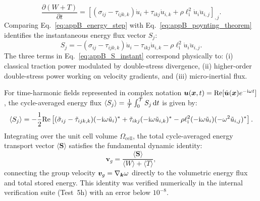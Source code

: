 \begin{equation}
\frac{\partial (W + T)}{\partial t} = \left[ (\sigma_{ij} - \tau_{ijk,k}) \dot{u}_i + \tau_{ikj} \dot{u}_{i,k} + \rho \ell_{\mathrm{i}}^2 \dot{u}_i \ddot{u}_{i,j} \right]_{,j}.
\label{eq:appB_energy_step}
\end{equation}
Comparing Eq.~\eqref{eq:appB_energy_step} with Eq.~\eqref{eq:appB_poynting_theorem} identifies the instantaneous energy flux vector $S_j$:
\begin{equation}
S_j = -(\sigma_{ij} - \tau_{ijk,k}) \dot{u}_i - \tau_{ikj} \dot{u}_{i,k} - \rho \ell_{\mathrm{i}}^2 \dot{u}_i \ddot{u}_{i,j}.
\label{eq:appB_S_instant}
\end{equation}
The three terms in Eq.~\eqref{eq:appB_S_instant} correspond physically to: (i) classical traction power modulated by double-stress divergence, (ii) higher-order double-stress power working on velocity gradients, and (iii) micro-inertial flux.

For time-harmonic fields represented in complex notation $\bm{u}(\bm{x}, t) = \mathrm{Re}[\tilde{\bm{u}}(\bm{x}) e^{-\mathrm{i} \omega t}]$, the cycle-averaged energy flux $\langle S_j \rangle = \frac{1}{\mathcal{T}}\int_0^{\mathcal{T}} S_j\,\mathrm{d} t$ is given by:
\begin{equation}
\langle S_j \rangle = -\frac{1}{2} \mathrm{Re} \left[ (\tilde{\sigma}_{ij} - \tilde{\tau}_{ijk,k}) (-\mathrm{i} \omega \tilde{u}_i)^* + \tilde{\tau}_{ikj} (-\mathrm{i} \omega \tilde{u}_{i,k})^* - \rho \ell_{\mathrm{i}}^2 (-\mathrm{i} \omega \tilde{u}_i) (-\omega^2 \tilde{u}_{i,j})^* \right].
\label{eq:appB_S_cycle}
\end{equation}
Integrating over the unit cell volume $\Omega_{\mathrm{cell}}$, the total cycle-averaged energy transport vector $\langle \bm{S} \rangle$ satisfies the fundamental dynamic identity:
\begin{equation}
\bm{v}_g = \frac{\langle \bm{S} \rangle}{\langle W \rangle + \langle T \rangle},
\label{eq:appB_vg_identity}
\end{equation}
connecting the group velocity $\bm{v}_g = \nabla_{\bm{k}}\omega$ directly to the volumetric energy flux and total stored energy. This identity was verified numerically in the internal verification suite (Test~5h) with an error below $10^{-8}$.
